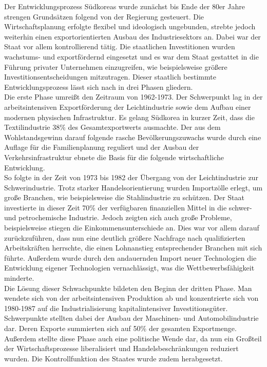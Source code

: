 Der Entwicklungsprozess Südkoreas wurde zunächst bis Ende der 80er Jahre strengen Grundsätzen folgend von der Regierung gesteuert. Die Wirtschaftsplanung erfolgte flexibel und ideologisch ungebunden, strebte jedoch weiterhin einen exportorientierten Ausbau des Industriesektors an. Dabei war der Staat vor allem kontrollierend tätig. Die staatlichen Investitionen wurden wachstums- und exportfördernd eingesetzt und es war dem Staat gestattet in die Führung privater Unternehmen einzugreifen, wie beispielsweise größere Investitionsentscheidungen mitzutragen. Dieser staatlich bestimmte Entwicklungsprozess lässt sich nach  \cite[S. 130-140]{Engelhard.2004} in drei  Phasen gliedern. \\
%
 Die erste Phase umreißt den Zeitraum von 1962-1973. Der Schwerpunkt lag in der arbeitsintensiven Exportförderung der Leichtindustrie sowie dem Aufbau einer modernen physischen Infrastruktur. Es gelang Südkorea in kurzer Zeit, dass die Textilindustrie 38{\%} des Gesamtexportwerts ausmachte. Der aus dem Wohlstandsgewinn darauf folgende rasche Bevölkerungszuwachs wurde durch eine Auflage für die Familienplanung reguliert und der Ausbau der Verkehrsinfrastruktur ebnete die Basis für die folgende wirtschaftliche Entwicklung. \\
%
 So folgte in der Zeit von 1973 bis 1982 der Übergang von der Leichtindustrie zur Schwerindustrie. Trotz starker Handelsorientierung wurden Importzölle erlegt, um große Branchen, wie beispielsweise die Stahlindustrie zu schützen. Der Staat investierte in dieser Zeit 70{\%} der verfügbaren finanziellen Mittel in die schwer- und petrochemische Industrie. Jedoch zeigten sich auch große Probleme, beispielsweise stiegen die Einkommensunterschiede an. Dies war vor allem darauf zurückzuführen, dass nun eine deutlich größere Nachfrage nach qualifizierten Arbeitskräften herrschte, die einen Lohnanstieg entsprechender Branchen mit sich führte. Außerdem wurde durch den andauernden Import neuer Technologien die Entwicklung eigener Technologien vernachlässigt, was die Wettbewerbsfähigkeit minderte. \\
%
 Die Lösung dieser Schwachpunkte bildeten den Beginn der dritten Phase. Man wendete sich von der arbeitsintensiven Produktion ab und konzentrierte sich von 1980-1987 auf die Industrialisierung kapitalintensiver Investitionsgüter. Schwerpunkte stellten dabei der Ausbau der Maschinen- und  Automobilindustrie dar. Deren Exporte summierten sich auf 50{\%} der gesamten Exportmenge. Außerdem stellte diese Phase auch eine politische Wende dar, da nun ein Großteil der Wirtschaftsprozesse liberalisiert und Handelsbeschränkungen reduziert wurden. Die Kontrollfunktion des Staates wurde zudem herabgesetzt. \\
